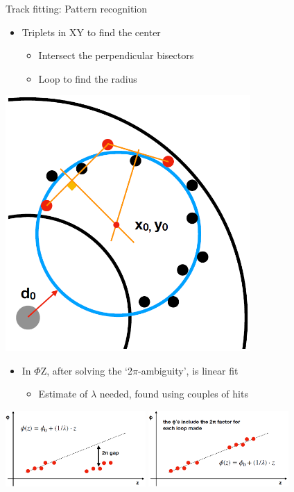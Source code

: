 \documentclass[10pt]{beamer}
\begin{document}
%
\begin{frame}{Track fitting: Pattern recognition}
\noindent
\begin{minipage}{.6\textwidth}
	\begin{itemize}
	\item Triplets in XY to find the center
	\begin{itemize}
	\setlength\itemsep{0.2cm}
		\item Intersect the perpendicular bisectors
		\item Loop to find the radius
	\end{itemize}
	\end{itemize}
\end{minipage}
\begin{minipage}{0.35\textwidth}
    \centering
    \includegraphics[width=0.7\textwidth]{giani_TrkPatRec_triplets}
\end{minipage}
\vspace{0.4cm}
\begin{itemize}
\item In $\Phi$Z, after solving the `2$\pi$-ambiguity', is linear fit 
	\begin{itemize}
	\setlength\itemsep{0.2cm}
		\item Estimate of $\lambda$ needed, found using couples of hits
	\end{itemize}
\end{itemize}
\vspace{0.4cm}
\centering
\includegraphics[width=0.4\textwidth]{giani_TrkPatRec_ambiguity0}
\includegraphics[width=0.4\textwidth]{giani_TrkPatRec_ambiguity1}
\end{frame}
\end{document}
